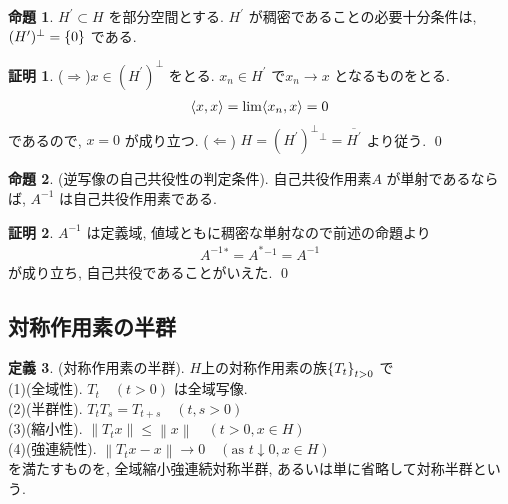 \documentclass[10pt, fleqn, label-section=none]{bxjsarticle}
\theoremstyle{definition}
\newtheorem{dfn}{定義}[section]
\newtheorem{prop}[dfn]{命題}
\newtheorem*{pf*}{証明}
\newcommand{\cbra}[1]{\mleft\{#1\mright\}}
\newcommand{\tbra}[1]{\mleft\langle#1\mright\rangle}
\newcommand{\norm}[1]{\left\|#1\right\|}
\newcommand{\naraba}{\Rightarrow}
\newcommand{\gyaku}{\Leftarrow}
\renewcommand{\;}{\, ; \,}
\newenvironment{claim}[1]{\par\noindent\underline{claim:}\space#1}{}
\newenvironment{claimproof}[1]{\par\noindent{($\because$)}\space#1}{\hfill $\blacktriangle $}
\begin{document}
\begin{prop}$H^\prime \subset H$  を部分空間とする. 
$H^\prime $ が稠密であることの必要十分条件は, $(H^\prime )^\perp = \cbra{0}$ である.
\end{prop}
\begin{pf*}
($\naraba$)$x \in (H^\prime )^\perp$ をとる. $x_n \in H^\prime$ で$x_n \rightarrow x$ となるものをとる. 
\begin{align*} \tbra{x,x} = \lim \tbra{x_n , x} = 0 \end{align*}
であるので, $x = 0$ が成り立つ. ($\gyaku $) $H = (H^\prime)^\perp {}^\perp = \overline {H^\prime} $ より従う. 
\qed
\end{pf*}


\begin{prop}(逆写像の自己共役性の判定条件).
自己共役作用素$A$ が単射であるならば, $A^{-1}$ は自己共役作用素である. 
\end{prop}
\begin{pf*}

$A^{-1}$ は定義域, 値域ともに稠密な単射なので前述の命題より
\begin{align*} A^{-1} {}^* = A^* {}^{-1} = A ^{-1}  \end{align*}
が成り立ち, 自己共役であることがいえた.
\qed
\end{pf*}



\subsection{対称作用素の半群}

\begin{dfn}(対称作用素の半群). $H$上の対称作用素の族$\cbra{T_t}_{t>0}$ で \\
(1)(全域性). $T_t\quad (t > 0)$ は全域写像. \\
(2)(半群性). $T_t T_s = T_{t+s} \quad (t,s > 0)$ \\
(3)(縮小性). $\norm{T_t x} \leq \norm{x} \quad (t > 0, x \in H)$ \\
(4)(強連続性). $\norm{T_t x - x} \rightarrow 0 \quad (\textrm{as}\,\, t \downarrow 0, x \in H)$\\
を満たすものを, 全域縮小強連続対称半群, あるいは単に省略して対称半群という. 
\end{dfn}
\end{document}
